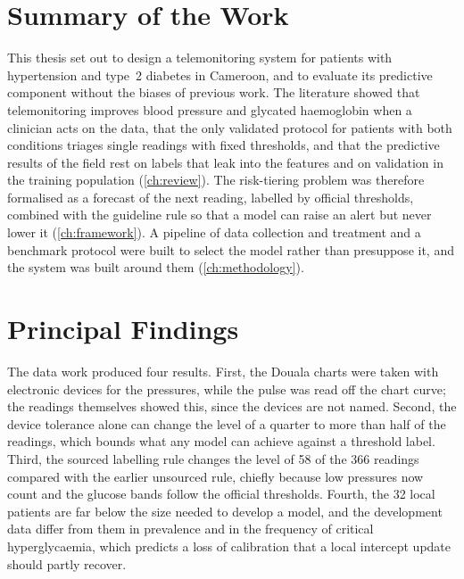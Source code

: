 \label{ch:conclusion}

\section*{Summary of the Work}

This thesis set out to design a telemonitoring system for patients with hypertension and type~2 diabetes in Cameroon, and to evaluate its predictive component without the biases of previous work. The literature showed that telemonitoring improves blood pressure and glycated haemoglobin when a clinician acts on the data, that the only validated protocol for patients with both conditions triages single readings with fixed thresholds, and that the predictive results of the field rest on labels that leak into the features and on validation in the training population (\cref{ch:review}). The risk-tiering problem was therefore formalised as a forecast of the next reading, labelled by official thresholds, combined with the guideline rule so that a model can raise an alert but never lower it (\cref{ch:framework}). A pipeline of data collection and treatment and a benchmark protocol were built to select the model rather than presuppose it, and the system was built around them (\cref{ch:methodology}).

\section*{Principal Findings}

The data work produced four results. First, the Douala charts were taken with electronic devices for the pressures, while the pulse was read off the chart curve; the readings themselves showed this, since the devices are not named. Second, the device tolerance alone can change the level of a quarter to more than half of the readings, which bounds what any model can achieve against a threshold label. Third, the sourced labelling rule changes the level of 58 of the 366 readings compared with the earlier unsourced rule, chiefly because low pressures now count and the glucose bands follow the official thresholds. Fourth, the 32 local patients are far below the size needed to develop a model, and the development data differ from them in prevalence and in the frequency of critical hyperglycaemia, which predicts a loss of calibration that a local intercept update should partly recover.

